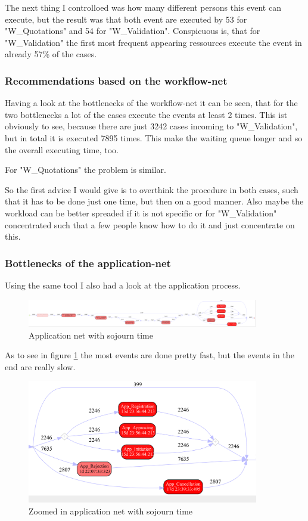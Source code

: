The next thing I controlloed was how many different persons this event can execute, but the result was that both event are executed by 53 for "W\_Quotations" and 54 for "W\_Validation". Conspicuous is, that for "W\_Validation" the first most frequent appearing ressources execute the event in already 57\% of the cases.

\subsubsection{Recommendations based on the workflow-net}

Having a look at the bottlenecks of the workflow-net it can be seen, that for the two bottlenecks a lot of the cases execute the events at least 2 times. This ist obviously to see, because there are just 3242 cases incoming to "W\_Validation", but in total it is executed 7895 times. This make the waiting queue longer and so the overall executing time, too. 

For "W\_Quotations" the problem is similar.

So the first advice I would give is to overthink the procedure in both cases, such that it has to be done just one time, but then on a good manner. Also maybe the workload can be better spreaded if it is not specific or for "W\_Validation" concentrated such that a few people know how to do it and just concentrate on this.


\subsubsection{Bottlenecks of the application-net}
Using the same tool I also had a look at the application process.

\begin{figure}[!htbp]
\centering
\includegraphics[width = 0.9\textwidth]{AppSojuCom.PNG}
\caption{Application net with sojourn time}
\label{fig: AppSojuComp}
\end{figure}

As to see in figure \ref{fig: AppSojuComp} the most events are done pretty fast, but the events in the end are really slow. 

\begin{figure}[!htbp]
\centering
\includegraphics[width = 0.9\textwidth]{AppSojuProb.PNG}
\caption{Zoomed in application net with sojourn time}
\label{fig: AppSojuCompProb}
\end{figure}

